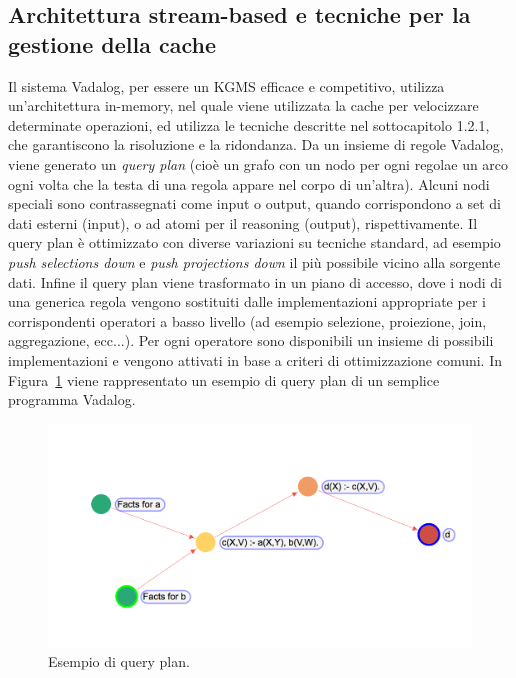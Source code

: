 \subsection{Architettura stream-based e tecniche per la gestione della cache}

Il sistema Vadalog, per essere un KGMS efficace e competitivo, utilizza un'architettura in-memory, nel quale viene utilizzata la cache per velocizzare determinate operazioni, ed utilizza le tecniche descritte nel sottocapitolo 1.2.1, che garantiscono la risoluzione e la ridondanza. \newline
Da un insieme di regole Vadalog, viene generato un \textit{query plan} (cioè un grafo con un nodo per ogni regolae un arco ogni volta che la testa di una regola appare nel corpo di un'altra). \newline
Alcuni nodi speciali sono contrassegnati come input o output, quando corrispondono a set di dati esterni (input), o ad atomi per il reasoning (output), rispettivamente.
Il query plan è ottimizzato con diverse variazioni su tecniche standard, ad esempio \textit{push selections down} e \textit{push projections down} il più possibile vicino alla sorgente dati. \newline
Infine il query plan viene trasformato in un piano di accesso, dove i nodi di una generica regola vengono sostituiti dalle implementazioni appropriate per i corrispondenti operatori a basso livello (ad esempio selezione, proiezione, join, aggregazione, ecc...). \newline
Per ogni operatore sono disponibili un insieme di possibili implementazioni e vengono attivati in base a criteri di ottimizzazione comuni. \newline
In Figura~\ref{fig:query_plan_1} viene rappresentato un esempio di query plan di un semplice programma Vadalog.
\begin{figure}[h!]
	\centering
	\includegraphics[width=0.8\linewidth]{figure/query-plan-ex1}
	\caption{Esempio di query plan.}
	\label{fig:query_plan_1}
\end{figure}


